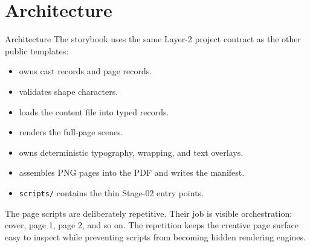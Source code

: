 \documentclass[
  ignorenonframetext,
]{beamer}
\author{\texorpdfstring{}{}}
\date{}
\providecommand{\tightlist}{%
  \setlength{\itemsep}{0pt}\setlength{\parskip}{0pt}}
\begin{document}
\section{Architecture}\label{architecture}

\begin{frame}{Architecture}
The storybook uses the same Layer-2 project contract as the other public
templates:

\begin{itemize}
\tightlist
\item
   owns cast records and page records.
\item
   validates shape characters.
\item
   loads the content file into typed
  records.
\item
   renders the full-page scenes.
\item
   owns deterministic typography,
  wrapping, and text overlays.
\item
   assembles PNG pages into the PDF
  and writes the manifest.
\item
  \texttt{scripts/} contains the thin Stage-02 entry points.
\end{itemize}

The page scripts are deliberately repetitive. Their job is visible
orchestration: cover, page 1, page 2, and so on. The repetition keeps
the creative page surface easy to inspect while preventing scripts from
becoming hidden rendering engines.
\end{frame}
\end{document}

